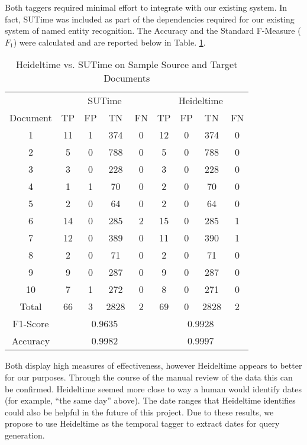 \documentclass{mprop}
\begin{document}
Both taggers required minimal effort to integrate with our existing system. In fact, SUTime was included as part of the dependencies required for our existing system of named entity recognition. The Accuracy and the Standard F-Measure (\textbf{$ F_1 $}) were calculated and are reported below in Table. \ref{temporalcomparison}.
\begin{table}[H]
\centering
\begin{tabular}{|c|c|c|c|c|c|c|c|c|}
\hline
& \multicolumn{4}{|c|}{SUTime}    & \multicolumn{4}{|c|}{Heideltime} \\ 
\cline{2-9}
Document & TP  & FP  & TN   & FN    & TP & FP & TN   & FN    \\ \hline
1        & 11  & 1   & 374  & 0	    & 12 & 0  & 374  & 0     \\ \hline
2        & 5   & 0	 & 788  & 0	    & 5  & 0  & 788  & 0     \\ \hline
3		 & 3   & 0   & 228  & 0		& 3  & 0  & 228  & 0	 \\ \hline
4        & 1   & 1	 & 70   & 0		& 2  & 0  & 70   & 0	 \\ \hline
5	     & 2   & 0	 & 64   & 0		& 2	 & 0  & 64   & 0     \\ \hline
6		 & 14  & 0	 & 285  & 2		& 15 & 0  & 285  & 1     \\ \hline
7		 & 12  & 0	 & 389  & 0		& 11 & 0  & 390  & 1	 \\ \hline
8		 & 2   & 0	 & 71   & 0	  	& 2	 & 0  & 71   & 0	 \\ \hline
9		 & 9   & 0	 & 287  & 0		& 9	 & 0  & 287  & 0	 \\ \hline
10		 & 7   & 1	 & 272  & 0		& 8	 & 0  & 271  & 0	 \\ \hline
Total    & 66  & 3	 & 2828 & 2	  	& 69 & 0  &	2828 & 2     \\ \hline
F1-Score & \multicolumn{4}{|c|}{0.9635} & \multicolumn{4}{|c|}{0.9928} \\ \hline
Accuracy & \multicolumn{4}{|c|}{0.9982} & \multicolumn{4}{|c|}{0.9997} \\ \hline
\end{tabular}
\caption{Heideltime vs. SUTime on Sample Source and Target Documents}
\label{temporalcomparison}
\end{table}
Both display high measures of effectiveness, however Heideltime appears to better for our purposes. Through the course of the manual review of the data this can be confirmed. Heideltime seemed more close to way a human would identify dates (for example, ``the same day'' above). The date ranges that Heideltime identifies could also be helpful in the future of this project. Due to these results, we propose to use Heideltime as the temporal tagger to extract dates for query generation.
\end{document}
